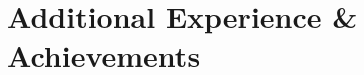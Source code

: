 \documentclass[letterpaper,10pt]{article}
\newcommand{\resumeSubHeadingListStart}{\begin{itemize}[leftmargin=*]}
\newcommand{\resumeSubHeadingListEnd}{\end{itemize}}
\newcommand{\shorterSection}[1]{\vspace{-10pt}\section{#1}}
\begin{document}
\shorterSection{Additional Experience \& Achievements}
\end{document}
